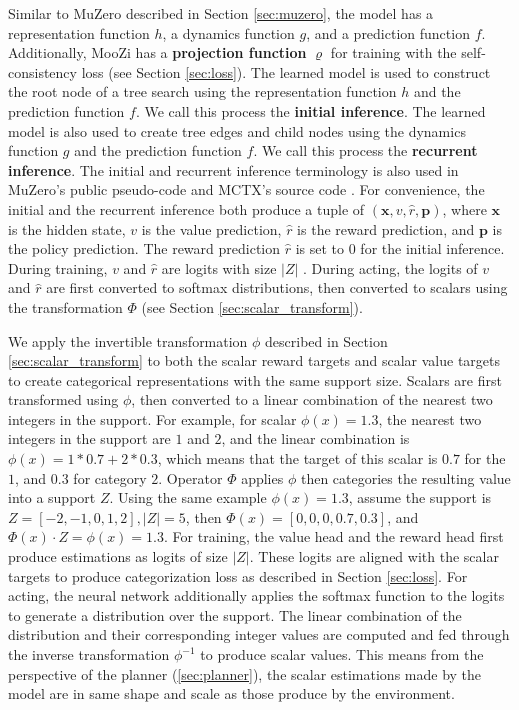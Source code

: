 Similar to MuZero described in Section \ref{sec:muzero}, the model has a representation function $h$, a dynamics function $g$, and a prediction function $f$.
Additionally, MooZi has a \textbf{projection function} $\varrho$ for training with the self-consistency loss (see Section \ref{sec:loss}).
The learned model is used to construct the root node of a tree search using the representation function $h$ and the prediction function $f$.
We call this process the \textbf{initial inference}.
The learned model is also used to create tree edges and child nodes using the dynamics function $g$ and the prediction function $f$.
We call this process the \textbf{recurrent inference}.
The initial and recurrent inference terminology is also used in MuZero's public pseudo-code and MCTX's source code \cite{MasteringChessShogi_Silver.Hubert.ea_2017,MctxMCTSinJAX__2022}.
For convenience, the initial and the recurrent inference both produce a tuple of $(\mathbf{x}, v, \hat{r}, \mathbf{p})$, where $\mathbf{x}$ is the hidden state, $v$ is the value prediction, $\hat{r}$ is the reward prediction, and $\mathbf{p}$ is the policy prediction.
The reward prediction $\hat{r}$ is set to 0 for the initial inference.
During training, $v$ and $\hat{r}$ are logits with size $|Z|$ .
During acting, the logits of $v$ and $\hat{r}$ are first converted to softmax distributions, then converted to scalars using the transformation $\Phi$ (see Section \ref{sec:scalar_transform}).

We apply the invertible transformation \( \phi \) described in Section \ref{sec:scalar_transform} to both the scalar reward targets and scalar value targets to create categorical representations with the same support size.
Scalars are first transformed using \( \phi \), then converted to a linear combination of the nearest two integers in the support.
For example, for scalar \(\phi(x) = 1.3\), the nearest two integers in the support are $1$ and $2$, and the linear combination is \( \phi(x) = 1 * 0.7 + 2 * 0.3 \), which means that the target of this scalar is $0.7$ for the $1$, and $0.3$ for category $2$.
Operator $\Phi$ applies $\phi$ then categories the resulting value into a support $Z$.
Using the same example $\phi(x) = 1.3$, assume the support is $Z = [-2, -1, 0, 1, 2], |Z| = 5$,
then $\Phi(x) = [0, 0, 0, 0.7, 0.3]$, and $\Phi(x) \cdot Z = \phi(x) = 1.3$.
For training, the value head and the reward head first produce estimations as logits of size $|Z|$.
These logits are aligned with the scalar targets to produce categorization loss as described in Section \ref{sec:loss}.
For acting, the neural network additionally applies the softmax function to the logits to generate a distribution over the support.
The linear combination of the distribution and their corresponding integer values are computed and fed through the inverse transformation \( \phi^{-1}\) to produce scalar values.
This means from the perspective of the planner (\ref{sec:planner}), the scalar estimations made by the model are in same shape and scale as those produce by the environment.

